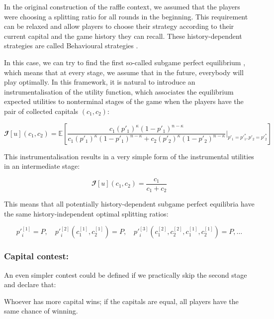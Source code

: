 \documentclass{article}
\theoremstyle{definition}
\begin{document}
In the original construction of the raffle context, we assumed that the players were choosing a splitting ratio for all rounds in the beginning.
This requirement can be relaxed and allow players to choose their strategy according to their current capital and the game history they can recall. These history-dependent strategies are called Behavioural strategies \cite{book:GameTheory}.

In this case, we can try to find the first so-called subgame perfect equilibrium \cite{book:GameTheory}, which means that at every stage, we assume that in the future, everybody will play optimally.
In this framework, it is natural to introduce an instrumentalisation of the utility function, which associates the equilibrium expected utilities to nonterminal stages of the game when the players have the pair of collected capitals $(c_1,c_2)$:

\begin{equation}
    \mathbfcal{I}[u](c_1,c_2) = \mathbb{E} \left [ \frac{c_1 (p'_1)^\kappa (1-p'_1)^{n-\kappa}}{c_1 (p'_1)^\kappa (1-p'_1)^{n-\kappa} + c_2 (p'_2)^\kappa  (1-p'_2)^{n-\kappa}} \Bigr|_{p'_1 = p'^*_1, p'_2 = p'^*_2} \right ]
\end{equation}

This instrumentalisation results in a very simple form of the instrumental utilities in an intermediate stage:

\begin{equation}
    \mathbfcal{I}[u](c_1,c_2) = \frac{c_1}{c_1+c_2}
\end{equation}

This means that all potentially history-dependent subgame perfect equilibria have the same history-independent optimal splitting ratios:

\begin{equation}
    p'^{[1]}_i = P, \quad p'^{[2]}_i(c^{[1]}_1,c^{[1]}_2) = P, \quad p'^{[3]}_i(c^{[2]}_1,c^{[2]}_2,c^{[1]}_1,c^{[1]}_2) = P,
    \dots
\end{equation}


\subsubsection{Capital contest:}

An even simpler contest could be defined if we practically skip the second stage and declare that:

Whoever has more capital wins; if the capitals are equal, all players have the same chance of winning.
\end{document}
